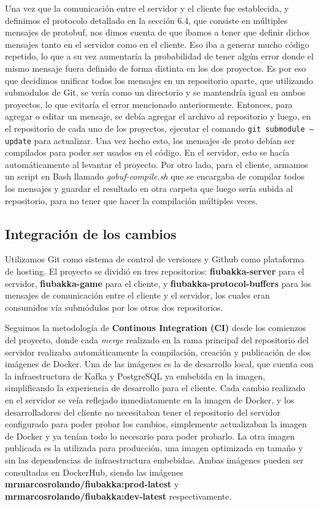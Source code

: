 Una vez que la comunicación entre el servidor y el cliente fue establecida, y definimos el protocolo detallado en la sección 6.4, que consiste en
múltiples mensajes de protobuf, nos dimos cuenta de que íbamos a tener que definir dichos mensajes tanto en el servidor como en el cliente. Eso iba
a generar mucho código repetido, lo que a su vez aumentaría la probabilidad de tener algún error donde el mismo mensaje fuera definido de
forma distinta en los dos proyectos. Es por eso que decidimos unificar todos los mensajes en un repositorio aparte, que utilizando submodulos
de Git, se vería como un directorio y se mantendría igual en ambos proyectos, lo que evitaría el error mencionado anteriormente.
Entonces, para agregar o editar un mensaje, se debía agregar el archivo al repositorio y luego, en el repositorio de cada uno de los proyectos, 
ejecutar el comando \texttt{git submodule --update} para actualizar. Una vez hecho esto, los mensajes de proto debían ser compilados para poder
ser usados en el código. En el servidor, esto se hacía automáticamente al levantar el proyecto. Por otro lado, para el cliente, armamos un
script en Bash llamado \textit{gobuf-compile.sh} que se encargaba de compilar todos los mensajes y guardar el resultado en otra carpeta que 
luego sería subida al repositorio, para no tener que hacer la compilación múltiples veces.

\subsection{Integración de los cambios}

\noindent Utilizamos Git como sistema de control de versiones y Github como plataforma de hosting. El proyecto se dividió en tres repositorios: \textbf{fiubakka-server}
para el servidor, \textbf{fiubakka-game} para el cliente, y \textbf{fiubakka-protocol-buffers} para los mensajes de comunicación entre el cliente y el servidor, los cuales eran
consumidos vía submódulos por los otros dos repositorios.

Seguimos la metodología de \textbf{Continous Integration (CI)} desde los comienzos del proyecto, donde cada \textit{merge} realizado en la rama principal
del repositorio del servidor realizaba automáticamente la compilación, creación y publicación de dos imágenes de Docker. Una de las imágenes es la de desarrollo local, que cuenta
con la infraestructura de Kafka y PostgreSQL ya embebida en la imagen, simplificando la experiencia de desarrollo para el cliente. Cada cambio realizado en el servidor se veía reflejado
inmediatamente en la imagen de Docker, y los desarrolladores del cliente no necesitaban tener el repositorio del servidor configurado para poder probar los cambios, simplemente actualizaban la
imagen de Docker y ya tenían todo lo necesario para poder probarlo. La otra imagen publicada es la utilizada para producción, una imagen optimizada en tamaño y sin las dependencias de infraestructura
embebidas. Ambas imágenes pueden ser consultadas en DockerHub, siendo las imágenes \textbf{mrmarcosrolando/fiubakka:prod-latest} y \textbf{mrmarcosrolando/fiubakka:dev-latest} respectivamente.

